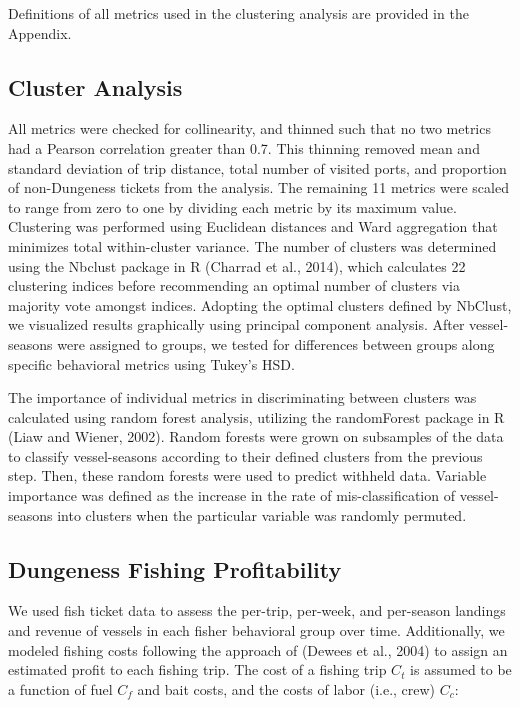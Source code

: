 \documentclass[]{elsarticle} %
\begin{document}
Definitions of all metrics used in the clustering analysis are provided
in the Appendix.

\hypertarget{cluster-analysis}{%
\subsection{Cluster Analysis}\label{cluster-analysis}}

All metrics were checked for collinearity, and thinned such that no two
metrics had a Pearson correlation greater than 0.7. This thinning
removed mean and standard deviation of trip distance, total number of
visited ports, and proportion of non-Dungeness tickets from the
analysis. The remaining 11 metrics were scaled to range from zero to one
by dividing each metric by its maximum value. Clustering was performed
using Euclidean distances and Ward aggregation that minimizes total
within-cluster variance. The number of clusters was determined using the
Nbclust package in R (Charrad et al., 2014), which calculates 22
clustering indices before recommending an optimal number of clusters via
majority vote amongst indices. Adopting the optimal clusters defined by
NbClust, we visualized results graphically using principal component
analysis. After vessel-seasons were assigned to groups, we tested for
differences between groups along specific behavioral metrics using
Tukey's HSD.

The importance of individual metrics in discriminating between clusters
was calculated using random forest analysis, utilizing the randomForest
package in R (Liaw and Wiener, 2002). Random forests were grown on
subsamples of the data to classify vessel-seasons according to their
defined clusters from the previous step. Then, these random forests were
used to predict withheld data. Variable importance was defined as the
increase in the rate of mis-classification of vessel-seasons into
clusters when the particular variable was randomly permuted.

\hypertarget{dungeness-fishing-profitability}{%
\subsection{Dungeness Fishing
Profitability}\label{dungeness-fishing-profitability}}

We used fish ticket data to assess the per-trip, per-week, and
per-season landings and revenue of vessels in each fisher behavioral
group over time. Additionally, we modeled fishing costs following the
approach of (Dewees et al., 2004) to assign an estimated profit to each
fishing trip. The cost of a fishing trip \(C_t\) is assumed to be a
function of fuel \(C_f\) and bait costs, and the costs of labor (i.e.,
crew) \(C_c\):
\end{document}
